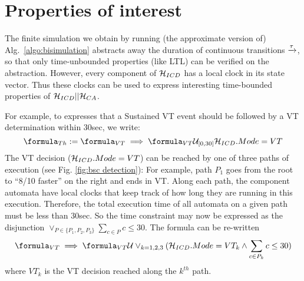 \section{Properties of interest}
\label{sec:properties}
The finite simulation we obtain by running (the approximate version of) Alg.~\ref{algo:bisimulation} abstracts away the duration of continuous transitions $\xrightarrow{\tau}$, so that only time-unbounded properties (like LTL) can be verified on the abstraction.
However, every component of $\mathcal{H}_{ICD}$ has a local clock in its state vector.
Thus these clocks can be used to express interesting time-bounded properties of $\mathcal{H}_{ICD}||\mathcal{H}_{CA}$.

For example, to expresses that a Sustained \ac{VT} event should be followed by a \ac{VT} determination within 30sec, we write:
\begin{equation}
\label{eq:fTh}
\formula_{Th} \defeq \formula_{VT} \implies \formula_{VT} \until_{[0,30]} \Sys_{ICD}.Mode = VT
\end{equation}
The VT decision ($\mathcal{H}_{ICD}.Mode = VT$) can be reached by one of three paths of execution (see Fig. \ref{fig:bsc detection}):
For example, path $P_1$ goes from the root to ``8/10 faster'' on the right and ends in VT.
Along each path, the component automata have local clocks that keep track of how long they are running in this execution.
Therefore, the total execution time of all automata on a given path must be less than 30sec.
So the time constraint may now be expressed as the disjunction $\lor_{P \in \{P_1,P_2,P_3\}}\sum_{c\in P} c \leq 30$.
The formula can be re-written
\begin{equation*}
\formula_{VT} \implies \formula_{VT}\until \lor_{k=1,2,3}(\Sys_{ICD}.Mode = VT_k \land \sum_{c \in P_k} c \leq 30)
\end{equation*}
where $VT_k$ is the VT decision reached along the $k^{th}$ path.
%


